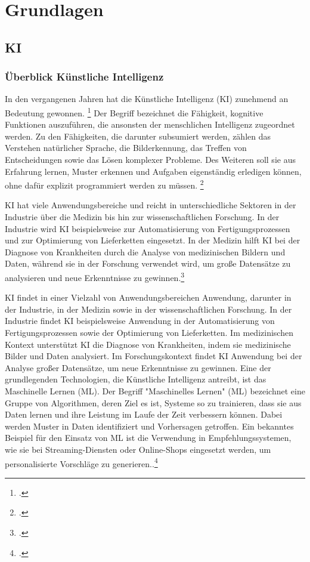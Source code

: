 \chapter{Grundlagen}

\section{KI}

\subsection{Überblick Künstliche Intelligenz}

In den vergangenen Jahren hat die Künstliche Intelligenz (KI) zunehmend an Bedeutung gewonnen. \footcite[28-30]{oecd_oecd-bericht_2024} Der Begriff bezeichnet die Fähigkeit, kognitive Funktionen auszuführen, die ansonsten der menschlichen Intelligenz zugeordnet werden. Zu den Fähigkeiten, die darunter subsumiert werden, zählen das Verstehen natürlicher Sprache, die Bilderkennung, das Treffen von Entscheidungen sowie das Lösen komplexer Probleme. Des Weiteren soll sie aus Erfahrung lernen, Muster erkennen und Aufgaben eigenständig erledigen können, ohne dafür explizit programmiert werden zu müssen. \footcite[9]{gethmann_kunstliche_2022}

\ac{KI} hat viele Anwendungsbereiche und reicht in unterschiedliche Sektoren in der Industrie über die Medizin bis hin zur wissenschaftlichen Forschung. In der Industrie wird KI beispielsweise zur Automatisierung von Fertigungsprozessen und zur Optimierung von Lieferketten eingesetzt. In der Medizin hilft KI bei der Diagnose von Krankheiten durch die Analyse von medizinischen Bildern und Daten, während sie in der Forschung verwendet wird, um große Datensätze zu analysieren und neue Erkenntnisse zu gewinnen.\footcite[9]{gethmann_kunstliche_2022}

\ac{KI} findet in einer Vielzahl von Anwendungsbereichen Anwendung, darunter in der Industrie, in der Medizin sowie in der wissenschaftlichen Forschung. In der Industrie findet KI beispielsweise Anwendung in der Automatisierung von Fertigungsprozessen sowie der Optimierung von Lieferketten. Im medizinischen Kontext unterstützt KI die Diagnose von Krankheiten, indem sie medizinische Bilder und Daten analysiert. Im Forschungskontext findet KI Anwendung bei der Analyse großer Datensätze, um neue Erkenntnisse zu gewinnen. Eine der grundlegenden Technologien, die Künstliche Intelligenz antreibt, ist das Maschinelle Lernen (ML). Der Begriff "Maschinelles Lernen" (ML) bezeichnet eine Gruppe von Algorithmen, deren Ziel es ist, Systeme so zu trainieren, dass sie aus Daten lernen und ihre Leistung im Laufe der Zeit verbessern können. Dabei werden Muster in Daten identifiziert und Vorhersagen getroffen. Ein bekanntes Beispiel für den Einsatz von ML ist die Verwendung in Empfehlungssystemen, wie sie bei Streaming-Diensten oder Online-Shops eingesetzt werden, um personalisierte Vorschläge zu generieren..\footcite[15]{oecd_oecd-bericht_2024}

